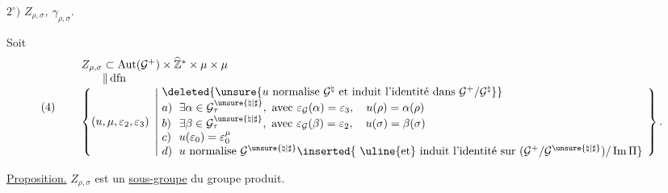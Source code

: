 

$2^\circ)$ \quad $Z_{\rho,\sigma},\ \gamma_{\rho,\sigma}$.

Soit
\[
\arraycolsep=3pt (4)\qquad
\begin{array}{l}
 Z_{\rho,\sigma}\subset
 \operatorname{Aut}(\mathcal{G}^{+})\times
 \widehat{\mathbb{Z}}^{*}\times\mu\times\mu\\
 \phantom{Z_{\rho,\sigma}}\Vert\,\mathrm{dfn}\\
 \left\{(u,\mu,\varepsilon_2,\varepsilon_3)\ \left|
 \begin{array}{ll}
 \multicolumn{2}{l}{\deleted{\unsure{u\ \text{normalise}\ \mathcal{G}^{\natural}\ 
 \text{et induit l'identité dans}\ \mathcal{G}^{+}/\mathcal{G}^{\natural}}}}\\
 a)&\exists\alpha\in\mathcal{G}_{\tau}^{\unsure{\natural|\sharp}},
 \ \text{avec }\varepsilon_{\mathcal{G}}(\alpha)=\varepsilon_3,
 \quad u(\rho)=\alpha(\rho)\\
 b)&\exists\beta\in\mathcal{G}_{\tau}^{\unsure{\natural|\sharp}},
 \ \text{avec }\varepsilon_{\mathcal{G}}(\beta)=\varepsilon_2,
 \quad u(\sigma)=\beta(\sigma)\\
 c)&u(\varepsilon_0)=\varepsilon_0^\mu\\
 d)&u\ \text{normalise }\mathcal{G}^{\unsure{\natural|\sharp}}
 \inserted{\ \text{\uline{et} induit l'identité sur }
 (\mathcal{G}^{+}/\mathcal{G}^{\unsure{\natural|\sharp}})/\operatorname{Im}\Pi}
 \end{array}\right.\right\}.
\end{array}
\]

\uline{Proposition.} \quad $Z_{\rho,\sigma}$ est un \uline{sous-groupe}
du groupe produit.

